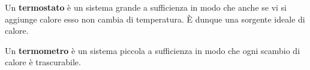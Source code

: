 \documentclass[a4paper]{report}
\begin{document}
\begin{definition}[Termostato]
Un \textbf{termostato} \`e un sistema grande a sufficienza in modo che anche se vi si aggiunge calore esso non cambia di temperatura. \`E dunque una sorgente ideale di calore.
\end{definition}

\begin{definition}[Termometro]
Un \textbf{termometro} \`e un sistema piccola a sufficienza in modo che ogni scambio di calore \`e trascurabile.
\end{definition}








%
\end{document}
